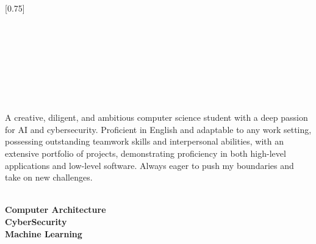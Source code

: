 \documentclass[lighthipster]{simplehipstercv}
\begin{document}
\setlength{\columnsep}{1cm}
[0.75]
\begin{paracol}{2}
 
\paracolbackgroundoptions
 
 
 
 
\footnotesize
{\setasidefontcolour
\flushright
\begin{center}
\end{center}
\begin{flushleft}
 
 \\[0.5em]
\\[0.5em]
\\[0.5em]
\\[0.5em]
\\[0.5em]
 
\bigskip
 
\\[0.5em]
 
{\footnotesize

A creative, diligent, and ambitious computer science student with a deep passion for AI and cybersecurity. Proficient in English and adaptable to any work setting, possessing outstanding teamwork skills and interpersonal abilities, with an extensive portfolio of projects, demonstrating proficiency in both high-level applications and low-level software. Always eager to push my boundaries and take on new challenges.}
\bigskip
 
 
 
 
 
 
 
 
\bigskip
 
 
\\[0.5em]
 
\textbf{Computer Architecture}\\
\textbf{CyberSecurity} \\
\textbf{Machine Learning} 
 

\end{flushleft}}
\end{paracol}
\end{document}
